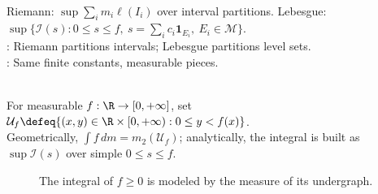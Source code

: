 \begin{perspective} \label{per:riemann-step-vs-lebesgue-simple} \\
Riemann: $\sup\sum_i m_i\ell(I_i)$ over interval partitions. Lebesgue: $\sup\{\mathcal{I}(s):0\leq s\leq f,\ s=\sum_ic_i\mathbf{1}_{E_i},\ E_i\in\mathcal{M}\}$.\\
: Riemann partitions intervals; Lebesgue partitions level sets.\\
: Same finite constants, measurable pieces.
\end{perspective}

\begin{perspective} \label{per:undergraph-geometric-integral} \\
For measurable $f:\R\to[0,+\infty]$, set $\mathcal{U}_f\defeq\{(x,y)\in\R\times[0,+\infty):0\leq y<f(x)\}$.\\
Geometrically, $\int f\,dm=m_2(\mathcal{U}_f)$; analytically, the integral is built as $\sup\mathcal{I}(s)$ over simple $0\leq s\leq f$.
\end{perspective}

\begin{figure}[H]
  \centering
  
  \caption{The integral of $f\geq0$ is modeled by the measure of its undergraph.}
  \label{fig:lebesgue-undergraph}
\end{figure}

